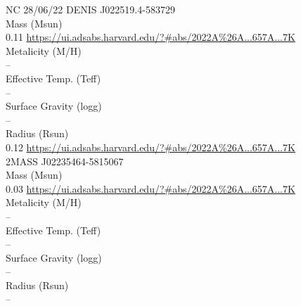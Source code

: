 NC 28/06/22
DENIS J022519.4-583729\\

Mass (Msun)\\
0.11 \url{https://ui.adsabs.harvard.edu/?#abs/2022A%26A...657A...7K}\\
Metalicity (M/H)\\
--\\
Effective Temp. (Teff)\\
--\\
Surface Gravity (logg)\\
--\\
Radius (Rsun)\\
0.12 \url{https://ui.adsabs.harvard.edu/?#abs/2022A%26A...657A...7K}\\

2MASS J02235464-5815067\\
Mass (Msun)\\
0.03 \url{https://ui.adsabs.harvard.edu/?#abs/2022A%26A...657A...7K}\\
Metalicity (M/H)\\
--\\
Effective Temp. (Teff)\\
--\\
Surface Gravity (logg)\\
--\\
Radius (Rsun)\\
--\\